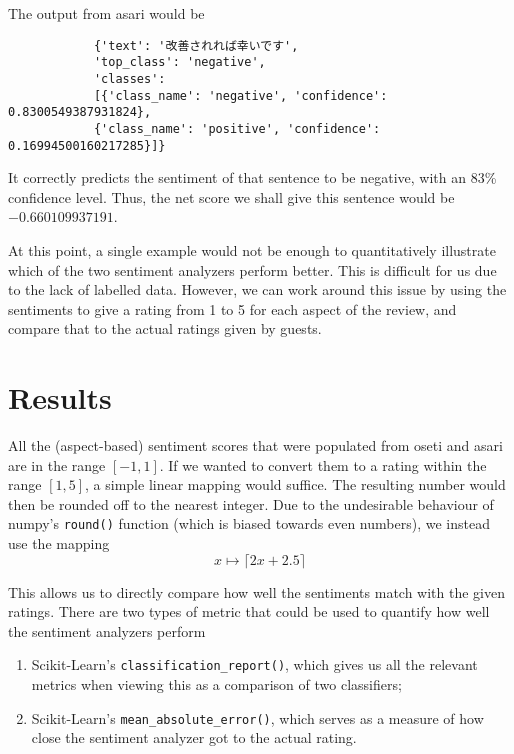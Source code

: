 \documentclass[12pt]{article}
\begin{document}
	The output from asari would be \begin{center}
		\begin{verbatim}
			{'text': '改善されれば幸いです',
			'top_class': 'negative',
			'classes': 
			[{'class_name': 'negative', 'confidence': 0.8300549387931824},
			{'class_name': 'positive', 'confidence': 0.16994500160217285}]}
		\end{verbatim}
	\end{center}
	
	It correctly predicts the sentiment of that sentence to be negative, with an 83\% confidence level. Thus, the net score we shall give this sentence would be $-0.660109937191$.
	
	At this point, a single example would not be enough to quantitatively illustrate which of the two sentiment analyzers perform better. This is difficult for us due to the lack of labelled data. However, we can work around this issue by using the sentiments to give a rating from 1 to 5 for each aspect of the review, and compare that to the actual ratings given by guests.
	
	\section{Results}
	
	All the (aspect-based) sentiment scores that were populated from oseti and asari are in the range $[-1,1]$. If we wanted to convert them to a rating within the range $[1,5]$, a simple linear mapping would suffice. The resulting number would then be rounded off to the nearest integer. Due to the undesirable behaviour of numpy's \verb*|round()| function (which is biased towards even numbers), we instead use the mapping \[x\mapsto \lceil 2x+2.5\rceil\] 
	
	This allows us to directly compare how well the sentiments match with the given ratings. There are two types of metric that could be used to quantify how well the sentiment analyzers perform \begin{enumerate}
		\item Scikit-Learn's \verb*|classification_report()|, which gives us all the relevant metrics when viewing this as a comparison of two classifiers;
		\item Scikit-Learn's \verb*|mean_absolute_error()|, which serves as a measure of how close the sentiment analyzer got to the actual rating.
	\end{enumerate}
	
\end{document}
